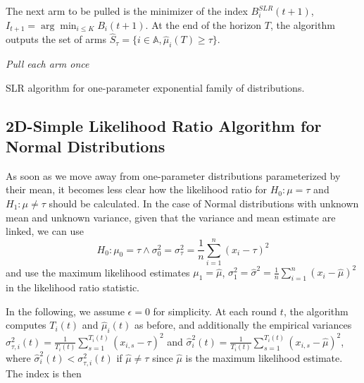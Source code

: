 \documentclass[11pt,]{article}
\begin{document}
The next arm to be pulled is the minimizer of the index
\(B_i^{SLR}(t+1)\), \(I_{t+1} = \arg \min_{i\leq K} B_i(t+1)\). At the
end of the horizon \(T\), the algorithm outputs the set of arms
\(\hat{S}_\tau = \{i \in \mathbb{A}, \hat{\mu}_i(T) \geq \tau\}\).

\IncMargin{1em}

\begin{algorithm}
\BlankLine
\emph{Pull each arm once}\;
\caption{SLR algorithm for one-parameter exponential family of distributions.}\label{algo_slr_1d}
\end{algorithm}

\DecMargin{1em}

\subsection{2D-Simple Likelihood Ratio Algorithm for Normal
Distributions}\label{d-simple-likelihood-ratio-algorithm-for-normal-distributions}

As soon as we move away from one-parameter distributions parameterized
by their mean, it becomes less clear how the likelihood ratio for
\(H_0: \mu = \tau\) and \(H_1: \mu \neq \tau\) should be calculated. In
the case of Normal distributions with unknown mean and unknown variance,
given that the variance and mean estimate are linked, we can use \[
H_0: \mu_0 = \tau \land \sigma_0^2 = \sigma^2_{\tau} = \frac{1}{n}\sum_{i=1}^{n}(x_i-\tau)^2  
\] and use the maximum likelihood estimates \(\mu_1 = \hat{\mu}\),
\(\sigma_1^2 = \hat{\sigma}^2 = \frac{1}{n}\sum_{i=1}^{n}(x_i-\hat{\mu})^2\)
in the likelihood ratio statistic.

In the following, we assume \(\epsilon = 0\) for simplicity. At each
round \(t\), the algorithm computes \(T_i(t)\) and \(\hat{\mu}_i(t)\) as
before, and additionally the empirical variances
\(\sigma_{\tau,i}^2(t) = \frac{1}{T_i(t)}\sum_{s=1}^{T_i(t)}(x_{i,s}-\tau)^2\)
and
\(\hat{\sigma}_{i}^2(t) = \frac{1}{T_i(t)}\sum_{s=1}^{T_i(t)}(x_{i,s}-\hat{\mu})^2\),
where \(\hat{\sigma}_{i}^2(t) < \sigma_{\tau,i}^2(t)\) if
\(\hat{\mu} \neq \tau\) since \(\hat{\mu}\) is the maximum likelihood
estimate. The index is then
\end{document}
